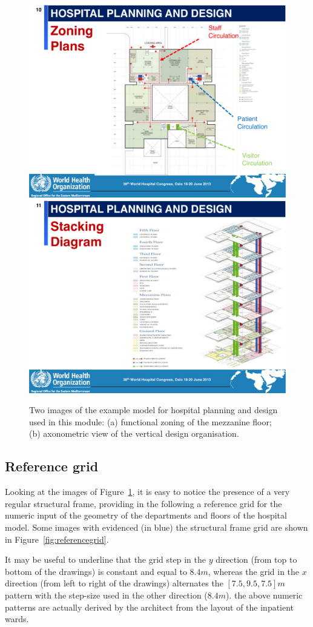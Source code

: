 \documentclass[11pt,oneside]{article}    %
\begin{document}
\begin{figure}[htbp] %
   \centering
   \includegraphics[width=0.495\linewidth]{images/hismail-1} 
   \includegraphics[width=0.495\linewidth]{images/hismail-2} 
   \caption{Two images of the example model for hospital planning and design used in this module: (a) functional zoning of the mezzanine floor; (b) axonometric view of the vertical design organisation.}
   \label{fig:hismail}
\end{figure}

\subsection{Reference grid}
\label{sec:grid}

Looking at the images of Figure~\ref{fig:hismail}, it is easy to notice the presence of a very regular structural frame, providing in the following a reference grid for the numeric input of the geometry of the departments and floors of the hospital model. Some images with evidenced (in blue) the structural frame grid are shown in Figure~\ref{fig:referencegrid}.

It may be useful to underline that the grid step in the $y$ direction (from top to bottom of the drawings) is constant and equal to $8.4 m$, whereas the grid in the $x$ direction (from left to right of the drawings) alternates the $[7.5,9.5,7.5] m$ pattern with the step-size used in the other direction ($8.4 m$).  the above numeric patterns are actually derived by the architect from the layout of the inpatient wards.
\end{document}
